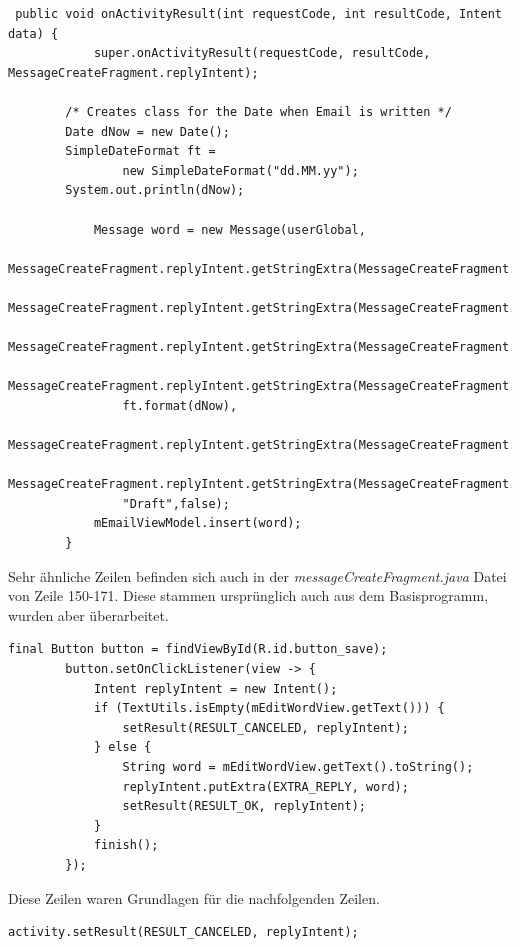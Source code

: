 \documentclass[a4paper,11pt]{article}
\begin{document}
\begin{appendices}
\lstset{language=java}
\begin{lstlisting}
 public void onActivityResult(int requestCode, int resultCode, Intent data) {
            super.onActivityResult(requestCode, resultCode, MessageCreateFragment.replyIntent);

        /* Creates class for the Date when Email is written */
        Date dNow = new Date();
        SimpleDateFormat ft =
                new SimpleDateFormat("dd.MM.yy");
        System.out.println(dNow);

            Message word = new Message(userGlobal,
                MessageCreateFragment.replyIntent.getStringExtra(MessageCreateFragment.EXTRA_TO),
                MessageCreateFragment.replyIntent.getStringExtra(MessageCreateFragment.EXTRA_CC),
                MessageCreateFragment.replyIntent.getStringExtra(MessageCreateFragment.EXTRA_BCC),
                MessageCreateFragment.replyIntent.getStringExtra(MessageCreateFragment.EXTRA_FROM),
                ft.format(dNow),
                MessageCreateFragment.replyIntent.getStringExtra(MessageCreateFragment.EXTRA_SUBJECT),
                MessageCreateFragment.replyIntent.getStringExtra(MessageCreateFragment.EXTRA_MESSAGE),
                "Draft",false);
            mEmailViewModel.insert(word);
        }
\end{lstlisting}

Sehr ähnliche Zeilen befinden sich auch in der \textit{messageCreateFragment.java} Datei von Zeile 150-171. Diese stammen ursprünglich auch aus dem Basisprogramm, 
wurden aber überarbeitet. 

\lstset{language=java}
\begin{lstlisting}
final Button button = findViewById(R.id.button_save);
        button.setOnClickListener(view -> {
            Intent replyIntent = new Intent();
            if (TextUtils.isEmpty(mEditWordView.getText())) {
                setResult(RESULT_CANCELED, replyIntent);
            } else {
                String word = mEditWordView.getText().toString();
                replyIntent.putExtra(EXTRA_REPLY, word);
                setResult(RESULT_OK, replyIntent);
            }
            finish();
        });
\end{lstlisting}

Diese Zeilen waren Grundlagen für die nachfolgenden Zeilen.

\lstset{language=java}
\begin{lstlisting}
activity.setResult(RESULT_CANCELED, replyIntent);


\end{lstlisting}
\end{appendices}
\end{document}
